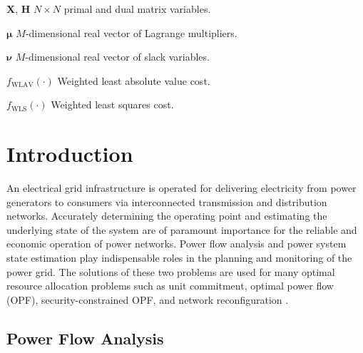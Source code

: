 \documentclass[journal,twoside]{IEEEtran}
\newcommand{\bH}{\mathbf{H}}
\newcommand{\bX}{\mathbf{X}}
\begin{document}
\begin{IEEEdescription}
\item[$\bX$, $\bH$] $N \times N$  primal and dual matrix variables.
\item[$\boldsymbol{\mu}$] $M$-dimensional real vector of Lagrange multipliers.
\item[$\boldsymbol{\nu}$] $M$-dimensional real vector of slack variables.
\item[$f_{\mathrm{WLAV}}(\cdot)$] Weighted least absolute value cost.
\item[$f_{\mathrm{WLS}}(\cdot)$] Weighted least squares cost. 

\end{IEEEdescription}




\section{Introduction}

An electrical grid infrastructure is operated for delivering electricity from
power generators to consumers via interconnected transmission and distribution networks.
Accurately determining the operating point and estimating the underlying state of the system are of paramount importance for the reliable and economic operation of power networks.
Power flow analysis and power system state estimation play indispensable roles in the planning and monitoring of the power grid. The solutions of these two problems are used for many optimal resource allocation problems such as unit commitment, optimal power flow (OPF), security-constrained OPF, and network reconfiguration \cite{Wollenberg13,GG13}.



\subsection{Power Flow Analysis} \vspace{0mm}
\end{document}
